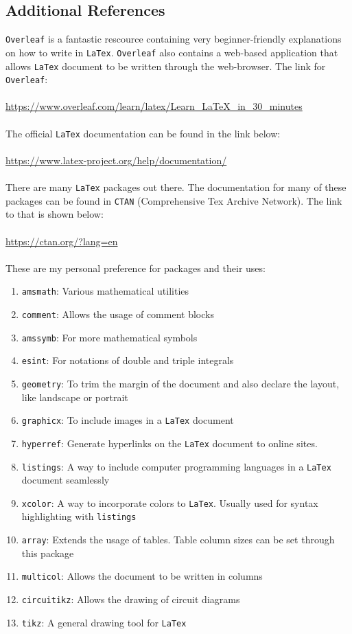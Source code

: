 \documentclass[a4paper, 12pt]{report}
\begin{document}
\begin{center}
\section{Additional References}
\begin{comment}
\end{comment}
\texttt{Overleaf} is a fantastic rescource containing very beginner-friendly explanations on how to write in \texttt{LaTex}. \texttt{Overleaf} also contains a web-based application that allows \texttt{LaTex} document to be written through the web-browser. The link for \texttt{Overleaf}:
\\~\\\url{https://www.overleaf.com/learn/latex/Learn_LaTeX_in_30_minutes} 
\\~\\The official \texttt{LaTex} documentation can be found in the link below:
\\~\\\url{https://www.latex-project.org/help/documentation/} 
\\~\\There are many \texttt{LaTex} packages out there. The documentation for many of these packages can be found in \texttt{CTAN} (Comprehensive Tex Archive Network). The link to that is shown below:
\\~\\\url{https://ctan.org/?lang=en} 
\\~\\These are my personal preference for packages and their uses:
\begin{enumerate}
\item \texttt{amsmath}: Various mathematical utilities
\item \texttt{comment}: Allows the usage of comment blocks
\item \texttt{amssymb}: For more mathematical symbols
\item \texttt{esint}: For notations of double and triple integrals
\item \texttt{geometry}: To trim the margin of the document and also declare the layout, like landscape or portrait
\item \texttt{graphicx}: To include images in a \texttt{LaTex} document
\item \texttt{hyperref}: Generate hyperlinks on the \texttt{LaTex} document to online sites.
\item \texttt{listings}: A way to include computer programming languages in a \texttt{LaTex} document seamlessly
\item \texttt{xcolor}: A way to incorporate colors to \texttt{LaTex}. Usually used for syntax highlighting with \texttt{listings}
\item \texttt{array}: Extends the usage of tables. Table column sizes can be set through this package
\item \texttt{multicol}: Allows the document to be written in columns
\item \texttt{circuitikz}: Allows the drawing of circuit diagrams
\item \texttt{tikz}: A general drawing tool for \texttt{LaTex} 
\end{enumerate}

\end{center}
\end{document}
